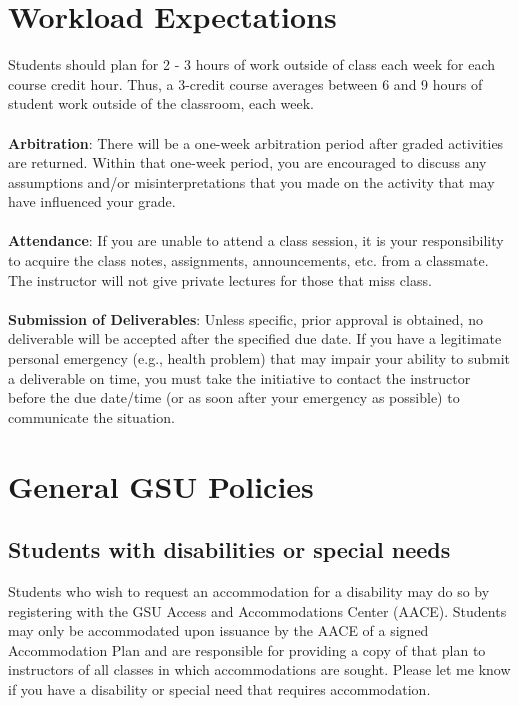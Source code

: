 \documentclass{article}
\begin{document}
\section{Workload Expectations}
Students should plan for 2 - 3 hours of work outside of class each week for each course credit hour. Thus, a 3-credit course averages between 6 and 9 hours of student work outside of the classroom, each week.
\\
\\
\textbf{Arbitration}: There will be a one-week arbitration period after graded activities are returned. Within that one-week period, you are encouraged to discuss any assumptions and/or misinterpretations that you made on the activity that may have inﬂuenced your grade.
\\
\\
\textbf{Attendance}: If you are unable to attend a class session, it is your responsibility to acquire the class notes, assignments, announcements, etc. from a classmate. The instructor will not give private lectures for those that miss class.
\\
\\
\textbf{Submission of Deliverables}: Unless speciﬁc, prior approval is obtained, no deliverable will be accepted after the speciﬁed due date. If you have a legitimate personal emergency (e.g., health problem) that may impair your ability to submit a deliverable on time, you must take the initiative to contact the instructor before the due date/time (or as soon after your emergency as possible) to communicate the situation. 

\section{General GSU Policies}
\subsection{Students with disabilities or special needs}
Students who wish to request an accommodation for a disability may do so by registering with the GSU Access and Accommodations Center (AACE).   Students may only be accommodated upon issuance by the AACE of a signed Accommodation Plan and are responsible for providing a copy of that plan to instructors of all classes in which accommodations are sought.  Please let me know if you have a disability or special need that requires accommodation.
\end{document}
